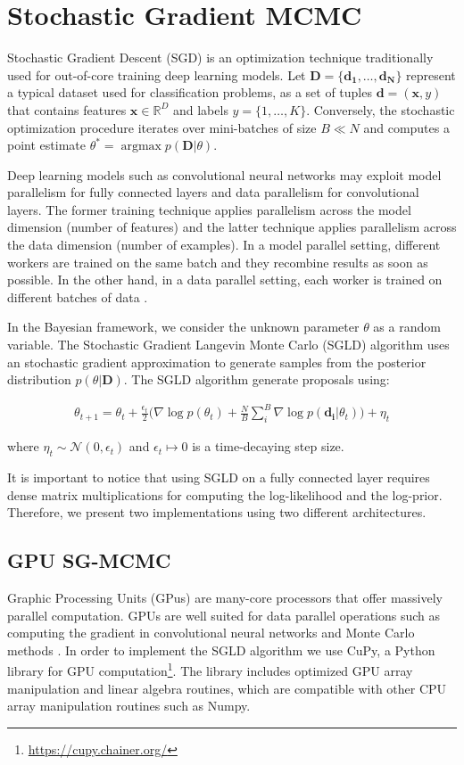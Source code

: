 \documentclass[9pt,lineno]{crone}
\begin{document}
\section{Stochastic Gradient MCMC}
Stochastic Gradient Descent (SGD) is an optimization technique traditionally used for out-of-core training deep learning models. Let $\mathbf{D}=\{\mathbf{d_1},\ldots,\mathbf{d_N}\}$ represent a typical dataset used for classification problems, as a set of tuples $\mathbf{d}=(\mathbf x,y)$ that contains features $\mathbf x \in \mathbb R^D$ and labels $y=\{1,\ldots,K\}$. Conversely, the stochastic optimization procedure iterates  over mini-batches of size $B \ll N$ and computes a point estimate $\theta^\ast = \operatorname{argmax} p(\mathbf{D} \vert \theta)$.

Deep learning models such as convolutional neural networks may exploit model parallelism for fully connected layers and data parallelism for convolutional layers. The former training technique applies parallelism across the model dimension (number of features) and the latter technique applies parallelism across the data dimension (number of examples). In a model parallel setting, different workers are trained on the same batch and they recombine results as soon as possible. In the other hand, in a data parallel setting, each worker is trained on different batches of data \cite{LI201695}. 

In the Bayesian framework, we consider the unknown parameter $\theta$ as a random variable. The Stochastic Gradient Langevin Monte Carlo (SGLD) algorithm uses an stochastic gradient approximation to generate samples from the posterior distribution $p(\theta \vert \mathbf{D})$. The SGLD algorithm generate proposals using:

\begin{align}
\theta_{t+1}=\theta_{t}+\frac{\epsilon_t}{2}\Big(\nabla\operatorname{log}p(\theta_{t})+\frac{N}{B} \sum_i^B \nabla \operatorname{log} p(\mathbf{d_i} \vert \theta_{t})\Big) + \eta_t
\label{eq:sgld}
\end{align}

where $\eta_t \sim \mathcal N(0,\epsilon_t)$ and $\epsilon_t \mapsto 0$ is a time-decaying step size.

It is important to notice that using SGLD on a fully connected layer requires dense matrix multiplications for computing the log-likelihood and the log-prior. Therefore, we present two implementations using two different architectures.  
    
\subsection{GPU SG-MCMC}
Graphic Processing Units (GPus) are many-core processors that offer massively parallel computation. GPUs are well suited for data parallel operations such as computing the gradient in convolutional neural networks and Monte Carlo methods \cite{lee2010utility}. In order to implement the SGLD algorithm we use CuPy, a Python library for GPU computation\footnote{\url{https://cupy.chainer.org/}}. The library includes optimized GPU array manipulation and linear algebra routines, which are compatible with other CPU array manipulation routines such as Numpy. 
 
\end{document}
